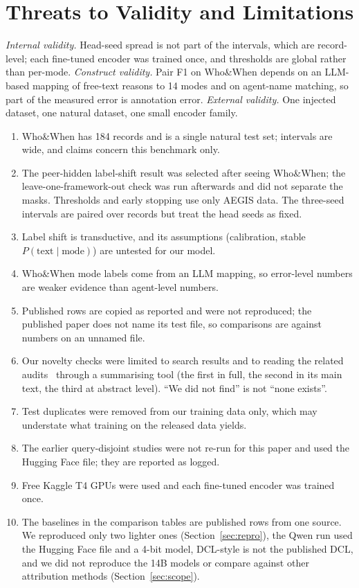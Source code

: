 \documentclass[conference]{IEEEtran}
\begin{document}
\section{Threats to Validity and Limitations}\label{sec:limits}
\emph{Internal validity.} Head-seed spread is not part of the intervals, which are record-level; each fine-tuned encoder was trained once, and thresholds are global rather than per-mode. \emph{Construct validity.} Pair F1 on Who\&When depends on an LLM-based mapping of free-text reasons to 14 modes and on agent-name matching, so part of the measured error is annotation error. \emph{External validity.} One injected dataset, one natural dataset, one small encoder family.
\begin{enumerate}
\item Who\&When has 184 records and is a single natural test set; intervals are wide, and claims concern this benchmark only.
\item The peer-hidden label-shift result was selected after seeing Who\&When; the leave-one-framework-out check was run afterwards and did not separate the masks. Thresholds and early stopping use only AEGIS data. The three-seed intervals are paired over records but treat the head seeds as fixed.
\item Label shift is transductive, and its assumptions (calibration, stable $P(\text{text}\mid\text{mode})$) are untested for our model.
\item Who\&When mode labels come from an LLM mapping, so error-level numbers are weaker evidence than agent-level numbers.
\item Published rows are copied as reported and were not reproduced; the published paper does not name its test file, so comparisons are against numbers on an unnamed file.
\item Our novelty checks were limited to search results and to reading the related audits~\cite{audit1,audit2,catch} through a summarising tool (the first in full, the second in its main text, the third at abstract level). ``We did not find'' is not ``none exists''.
\item Test duplicates were removed from our training data only, which may understate what training on the released data yields.
\item The earlier query-disjoint studies were not re-run for this paper and used the Hugging Face file; they are reported as logged.
\item Free Kaggle T4 GPUs were used and each fine-tuned encoder was trained once.
\item The baselines in the comparison tables are published rows from one source. We reproduced only two lighter ones (Section~\ref{sec:repro}), the Qwen run used the Hugging Face file and a 4-bit model, DCL-style is not the published DCL, and we did not reproduce the 14B models or compare against other attribution methods (Section~\ref{sec:scope}).

\end{enumerate}
\end{document}
